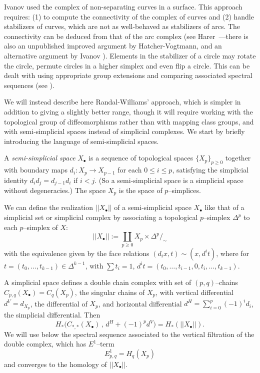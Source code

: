 \documentclass[10pt]{amsart}
\newcommand{\De}{\Delta}
\newcommand{\x}{\times}
\begin{document}
Ivanov used the complex of
non-separating curves in a surface. This approach requires: (1) to compute the connectivity of the complex of curves and
(2) handle stabilizers of curves, which are not as well-behaved as stabilizers of arcs. The connectivity can be
deduced from that of the arc complex (see Harer~\cite{Har85}---there is also an unpublished improved argument by
Hatcher-Vogtmann, and an alternative argument by Ivanov \cite{Iva87}). 
Elements in the stabilizer of a circle may rotate the circle, permute circles in a higher simplex and even
flip a circle. This can be
dealt with using appropriate group extensions and comparing associated spectral
sequences (see \cite{Iva93}). 

We will instead describe here Randal-Williams' approach, which is simpler in addition to giving a slightly
better range, though it will require working with the topological group of diffeomorphisms rather than with mapping
class groups, and with semi-simplicial spaces instead of simplicial complexes. 
We start by briefly introducing the language of semi-simplicial spaces.



\medskip


A {\em semi-simplicial space} $X_\bullet$ is a sequence of topological spaces $\{X_p\}_{p\ge 0}$ together with boundary maps 
$d_i\colon X_p\to X_{p-1}$ for each $0\le i\le p$, satisfying the simplicial identity $d_id_j=d_{j-1}d_i$ if $i<j$. 
(So a semi-simplicial space is a
simplicial space without degeneracies.) The space  $X_p$ is the space of $p$--simplices. 

We can define the realization $||X_\bullet||$ of a semi-simplicial space $X_\bullet$ like that of a simplicial set or
simplicial complex by associating a  topological
$p$--simplex $\De^p$ to each  $p$--simplex of $X$: 
$$||X_\bullet||:=\coprod_{p\ge 0}X_p\x \De^p/_\sim$$
with the equivalence given by the face relations $(d_ix,t)\sim (x,d^it)$, where for $t=(t_0,\dots,t_{k-1})\in\De^{k-1}$, with $\sum
t_i=1$, $d^it=(t_0,\dots,t_{i-1},0,t_i,\dots,t_{k-1})$. 

A simplicial space defines a double chain complex with set of $(p,q)$--chains $C_{p,q}(X_\bullet)=C_q(X_p)$, the singular
chains of $X_p$, with vertical differential
$d^V=d_{X_p}$, the differential of $X_p$, and horizontal differential $d^H=\sum_{i=0}^p(-1)^id_i$, the simplicial
differential.  Then $$H_*\big(C_{*,*}(X_\bullet)\,,\,d^H\!\!+\!(-1)^pd^V\big)=H_*(||X_\bullet||).$$ 
We will use below the spectral sequence associated
to the vertical filtration of the double complex, which has $E^1$--term 
$$E^1_{p,q}=H_q(X_p)$$
and converges to the homology of $||X_\bullet||$. 
\end{document}
